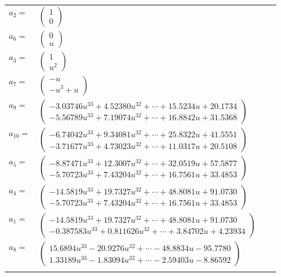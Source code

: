 \documentclass[1p]{elsarticle_modified}
\theoremstyle{definition}
\begin{document}
\begin{tabular}{m{7pt} m{180pt} m{7pt} m{180pt} }
\flushright $a_{2}=$&$\begin{pmatrix}1\\0\end{pmatrix}$ \\
\flushright $a_{6}=$&$\begin{pmatrix}0\\u\end{pmatrix}$ \\
\flushright $a_{3}=$&$\begin{pmatrix}1\\u^2\end{pmatrix}$ \\
\flushright $a_{7}=$&$\begin{pmatrix}- u\\- u^3+u\end{pmatrix}$ \\
\flushright $a_{9}=$&$\begin{pmatrix}-3.03746 u^{33}+4.52380 u^{32}+\cdots+15.5234 u+20.1734\\-5.56789 u^{33}+7.19074 u^{32}+\cdots+16.8842 u+31.5368\end{pmatrix}$ \\
\flushright $a_{10}=$&$\begin{pmatrix}-6.74042 u^{33}+9.34081 u^{32}+\cdots+25.8322 u+41.5551\\-3.71677 u^{33}+4.73023 u^{32}+\cdots+11.0317 u+20.5108\end{pmatrix}$ \\
\flushright $a_{5}=$&$\begin{pmatrix}-8.87471 u^{33}+12.3007 u^{32}+\cdots+32.0519 u+57.5877\\-5.70723 u^{33}+7.43204 u^{32}+\cdots+16.7561 u+33.4853\end{pmatrix}$ \\
\flushright $a_{4}=$&$\begin{pmatrix}-14.5819 u^{33}+19.7327 u^{32}+\cdots+48.8081 u+91.0730\\-5.70723 u^{33}+7.43204 u^{32}+\cdots+16.7561 u+33.4853\end{pmatrix}$ \\
\flushright $a_{1}=$&$\begin{pmatrix}-14.5819 u^{33}+19.7327 u^{32}+\cdots+48.8081 u+91.0730\\-0.387583 u^{33}+0.811626 u^{32}+\cdots+3.84702 u+4.23934\end{pmatrix}$ \\
\flushright $a_{8}=$&$\begin{pmatrix}15.6894 u^{33}-20.9276 u^{32}+\cdots-48.8834 u-95.7780\\1.33189 u^{33}-1.83094 u^{32}+\cdots-2.59403 u-8.86592\end{pmatrix}$\\&\end{tabular}
\end{document}
